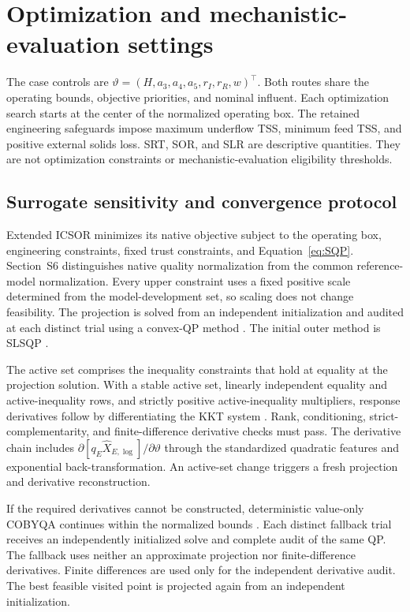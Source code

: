 \documentclass[a4paper,fleqn]{cas-sc}
\begin{document}
\section{Optimization and mechanistic-evaluation settings}

The case controls are $\vartheta=(H,a_3,a_4,a_5,r_I,r_R,w)^\top$. Both routes share the operating bounds, objective priorities, and nominal influent. Each optimization search starts at the center of the normalized operating box. The retained engineering safeguards impose maximum underflow TSS, minimum feed TSS, and positive external solids loss. SRT, SOR, and SLR are descriptive quantities. They are not optimization constraints or mechanistic-evaluation eligibility thresholds.

\subsection{Surrogate sensitivity and convergence protocol}
\label{sec:Ssurrogatesearch}

Extended ICSOR minimizes its native objective subject to the operating box, engineering constraints, fixed trust constraints, and Equation~\eqref{eq:SQP}. Section~S6 distinguishes native quality normalization from the common reference-model normalization. Every upper constraint uses a fixed positive scale determined from the model-development set, so scaling does not change feasibility. The projection is solved from an independent initialization and audited at each distinct trial using a convex-QP method \citep{Stellato2020}. The initial outer method is SLSQP \citep{Kraft1988}.

The active set comprises the inequality constraints that hold at equality at the projection solution. With a stable active set, linearly independent equality and active-inequality rows, and strictly positive active-inequality multipliers, response derivatives follow by differentiating the KKT system \citep{Tondel2003}. Rank, conditioning, strict-complementarity, and finite-difference derivative checks must pass. The derivative chain includes $\partial[q_E\widehat X_{E,\log}]/\partial\vartheta$ through the standardized quadratic features and exponential back-transformation. An active-set change triggers a fresh projection and derivative reconstruction.

If the required derivatives cannot be constructed, deterministic value-only COBYQA continues within the normalized bounds \citep{Ragonneau2022}. Each distinct fallback trial receives an independently initialized solve and complete audit of the same QP. The fallback uses neither an approximate projection nor finite-difference derivatives. Finite differences are used only for the independent derivative audit. The best feasible visited point is projected again from an independent initialization.
\end{document}
